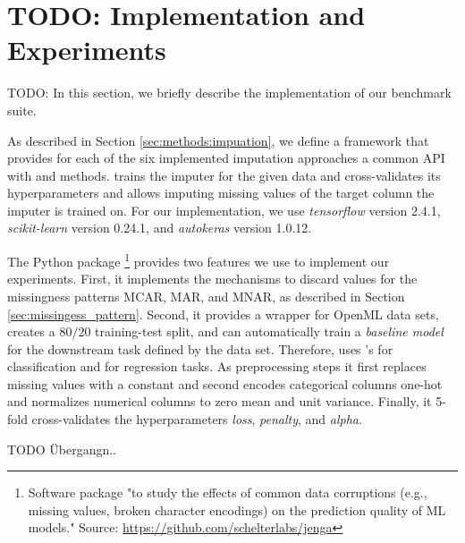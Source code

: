 
\section{TODO: Implementation and Experiments}
%
TODO: In this section, we briefly describe the implementation of our benchmark suite.

As described in Section \ref{sec:methods:impuation}, we define a framework that provides for each of the six implemented imputation approaches a common API with  and  methods.  trains the imputer for the given data and cross-validates its hyperparameters and  allows imputing missing values of the target column the imputer is trained on. For our implementation, we use \emph{tensorflow} version 2.4.1, \emph{scikit-learn} version 0.24.1, and \emph{autokeras} version 1.0.12.

The Python package \footnote{Software package "to study the effects of common data corruptions (e.g., missing values, broken character encodings) on the prediction quality of ML models." Source: \url{https://github.com/schelterlabs/jenga}} \citep{Jenga} provides two features we use to implement our experiments. First, it implements the mechanisms to discard values for the missingness patterns MCAR, MAR, and MNAR, as described in Section \ref{sec:missingess_pattern}. Second, it provides a wrapper for OpenML data sets, creates a $80/20$ training-test split, and can automatically train a \emph{baseline model} for the downstream task defined by the data set. Therefore,  uses 's  for classification and  for regression tasks. As preprocessing steps it first replaces missing values with a constant and second encodes categorical columns one-hot and normalizes numerical columns to zero mean and unit variance. Finally, it 5-fold cross-validates the hyperparameters \emph{loss}, \emph{penalty}, and \emph{alpha}.

TODO Übergangn..

